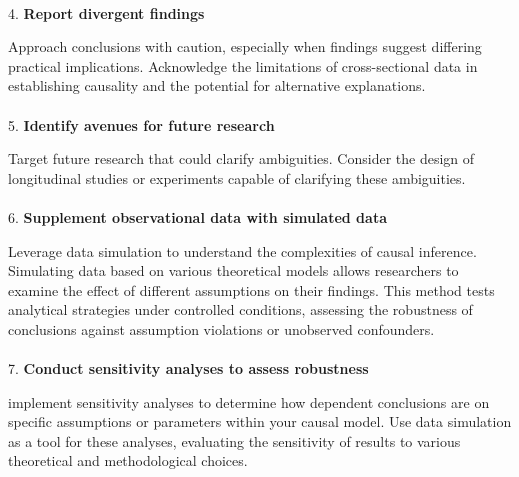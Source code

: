\documentclass[
  single column]{article}
\makeatletter
\let\oldparagraph\paragraph
\renewcommand{\paragraph}{
    \@ifstar
      \xxxParagraphStar
      \xxxParagraphNoStar
  }
\newcommand{\xxxParagraphStar}[1]{\oldparagraph*{#1}\mbox{}}
\newcommand{\xxxParagraphNoStar}[1]{\oldparagraph{#1}\mbox{}}
\makeatother
\begin{document}
\paragraph{\texorpdfstring{4. \textbf{Report divergent
findings}}{4. Report divergent findings}}\label{report-divergent-findings}

Approach conclusions with caution, especially when findings suggest
differing practical implications. Acknowledge the limitations of
cross-sectional data in establishing causality and the potential for
alternative explanations.

\paragraph{\texorpdfstring{5. \textbf{Identify avenues for future
research}}{5. Identify avenues for future research}}\label{identify-avenues-for-future-research}

Target future research that could clarify ambiguities. Consider the
design of longitudinal studies or experiments capable of clarifying
these ambiguities.

\paragraph{\texorpdfstring{6. \textbf{Supplement observational data with
simulated
data}}{6. Supplement observational data with simulated data}}\label{supplement-observational-data-with-simulated-data}

Leverage data simulation to understand the complexities of causal
inference. Simulating data based on various theoretical models allows
researchers to examine the effect of different assumptions on their
findings. This method tests analytical strategies under controlled
conditions, assessing the robustness of conclusions against assumption
violations or unobserved confounders.

\paragraph{\texorpdfstring{7. \textbf{Conduct sensitivity analyses to
assess
robustness}}{7. Conduct sensitivity analyses to assess robustness}}\label{conduct-sensitivity-analyses-to-assess-robustness}

implement sensitivity analyses to determine how dependent conclusions
are on specific assumptions or parameters within your causal model. Use
data simulation as a tool for these analyses, evaluating the sensitivity
of results to various theoretical and methodological choices.
\end{document}
